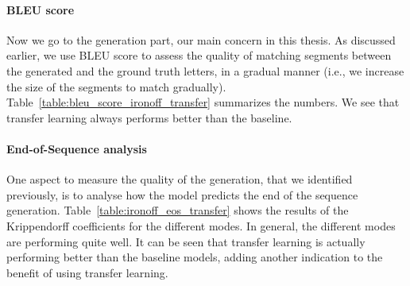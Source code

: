 
    \paragraph{BLEU score}
      Now we go to the generation part, our main concern in this thesis. As discussed earlier, we use BLEU score to assess the quality of matching segments between the generated and the ground truth letters, in a gradual manner (i.e., we increase the size of the segments to match gradually). Table~\ref{table:bleu_score_ironoff_transfer} summarizes the numbers. We see that transfer learning always performs better than the baseline.
    \paragraph{End-of-Sequence analysis}
    One aspect to measure the quality of the generation, that we identified previously, is to analyse how the model predicts the end of the sequence generation. Table~\ref{table:ironoff_eos_transfer} shows the results of the Krippendorff coefficients for the different modes. In general, the different modes are performing quite well. It can be seen that transfer learning is actually performing better than the baseline models, adding another indication to the benefit of using transfer learning.

